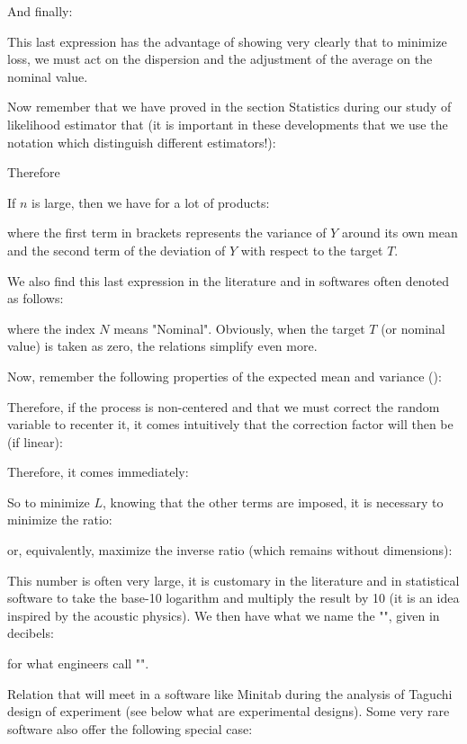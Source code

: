 	And finally:
	
	This last expression has the advantage of showing very clearly that to minimize loss, we must act on the dispersion and the adjustment of the average on the nominal value.
	
	Now remember that we have proved in the section Statistics during our study of likelihood estimator that (it is important in these developments that we use the notation which distinguish different estimators!):
	
	Therefore
	
	If $n$ is large, then we have for a lot of products:
	
	where the first term in brackets represents the variance of $Y$ around its own mean and the second term of the deviation of $Y$ with respect to the target $T$.
	
	We also find this last expression in the literature and in softwares often denoted as follows:
	
	where the index $N$ means "Nominal". Obviously, when the target $T$ (or nominal value) is taken as zero, the relations simplify even more.
	
	Now, remember the following properties of the expected mean and variance ():
	
	Therefore, if the process is non-centered and that we must correct the random variable to recenter it, it comes intuitively that the correction factor will then be (if linear):
	
	Therefore, it comes immediately:
	
	So to minimize $L$, knowing that the other terms are imposed, it is necessary to minimize the ratio:
	
	or, equivalently, maximize the inverse ratio (which remains without dimensions):
	
	This number is often very large, it is customary in the literature and in statistical software to take the base-10 logarithm and multiply the result by 10 (it is an idea inspired by the acoustic physics). We then have what we name the "", given in decibels:
	
	for what engineers call "".
	
	Relation that will meet in a software like Minitab during the analysis of Taguchi design of experiment (see below what are experimental designs). Some very rare software also offer the following special case:
	
